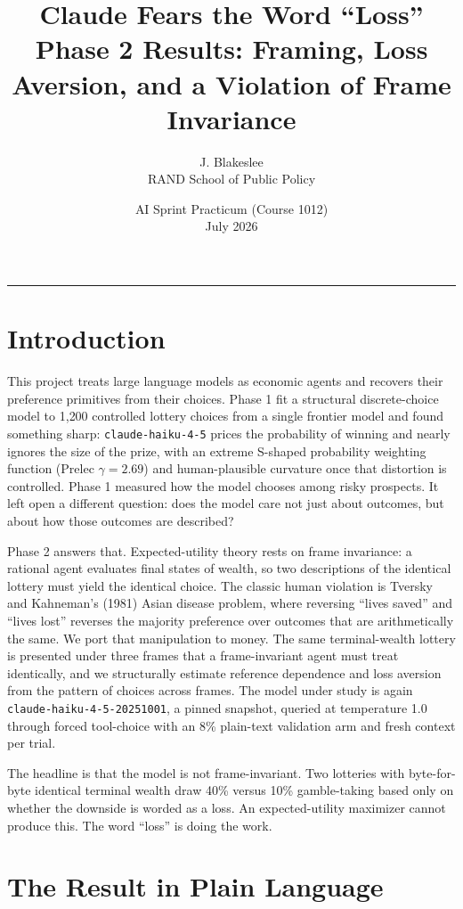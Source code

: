\documentclass[11pt]{article}
\title{\vspace{-1.5em}\textbf{Claude Fears the Word ``Loss''}\\[0.3em]
\large Phase 2 Results: Framing, Loss Aversion, and a Violation of Frame Invariance}
\author{J. Blakeslee \\ \small RAND School of Public Policy}
\date{\small AI Sprint Practicum (Course 1012) \\ \small July 2026}
\begin{document}
\maketitle

\hrule
\vspace{0.5em}

\section{Introduction}

This project treats large language models as economic agents and recovers their preference primitives
from their choices. Phase 1 fit a structural discrete-choice model to 1{,}200 controlled lottery
choices from a single frontier model and found something sharp: \texttt{claude-haiku-4-5} prices the
probability of winning and nearly ignores the size of the prize, with an extreme S-shaped probability
weighting function (Prelec $\gamma = 2.69$) and human-plausible curvature once that distortion is
controlled. Phase 1 measured how the model chooses among risky prospects. It left open a different
question: does the model care not just about outcomes, but about how those outcomes are described?

Phase 2 answers that. Expected-utility theory rests on frame invariance: a rational agent evaluates
final states of wealth, so two descriptions of the identical lottery must yield the identical choice.
The classic human violation is Tversky and Kahneman's (1981) Asian disease problem, where reversing
``lives saved'' and ``lives lost'' reverses the majority preference over outcomes that are arithmetically
the same. We port that manipulation to money. The same terminal-wealth lottery is presented under three
frames that a frame-invariant agent must treat identically, and we structurally estimate reference
dependence and loss aversion from the pattern of choices across frames. The model under study is again
\texttt{claude-haiku-4-5-20251001}, a pinned snapshot, queried at temperature 1.0 through forced
tool-choice with an 8\% plain-text validation arm and fresh context per trial.

The headline is that the model is not frame-invariant. Two lotteries with byte-for-byte identical
terminal wealth draw 40\% versus 10\% gamble-taking based only on whether the downside is worded as a
loss. An expected-utility maximizer cannot produce this. The word ``loss'' is doing the work.

\section{The Result in Plain Language}
\end{document}
